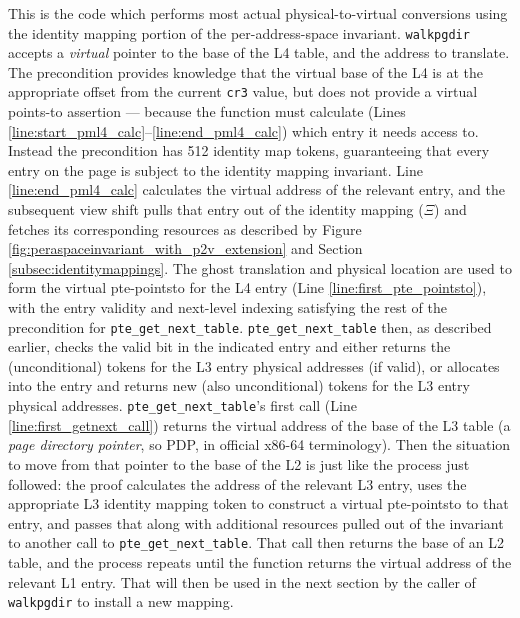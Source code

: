 This is the code which performs most actual physical-to-virtual conversions using the identity mapping portion of the per-address-space invariant.
\lstinline|walkpgdir| accepts a \emph{virtual} pointer to the base of the L4 table, and the address to translate.
The precondition provides knowledge that the virtual base of the L4 is at the appropriate offset from the current \lstinline|cr3| value,
but does not provide a virtual points-to assertion --- because the function must calculate (Lines \ref{line:start_pml4_calc}--\ref{line:end_pml4_calc})
which entry it needs access to.
Instead the precondition has 512 identity map tokens, guaranteeing that every entry on the page is subject to the identity mapping invariant.
Line \ref{line:end_pml4_calc} calculates the virtual address of the relevant entry, and the subsequent view shift
pulls that entry out of the identity mapping ($\Xi$) and fetches its corresponding resources as
described by Figure \ref{fig:peraspaceinvariant_with_p2v_extension} and Section \ref{subsec:identitymappings}.
The ghost translation and physical location are used to form the virtual pte-pointsto for the L4 entry
(Line \ref{line:first_pte_pointsto}), with the entry validity and next-level indexing
satisfying the rest of the precondition for \lstinline|pte_get_next_table|.
\lstinline|pte_get_next_table| then, as described earlier, checks the valid bit in the indicated
entry and either returns the (unconditional) tokens for the L3 entry physical addresses (if valid), or
allocates into the entry and returns new (also unconditional) tokens for the L3 entry physical addresses.
\lstinline|pte_get_next_table|'s first call (Line \ref{line:first_getnext_call}) returns
the virtual address of the base of the L3 table (a \emph{page directory pointer}, so PDP, in official
x86-64 terminology). Then the situation to move from that pointer to the base of the L2
is just like the process just followed: the proof calculates the address of the relevant
L3 entry, uses the appropriate L3 identity mapping token to construct a virtual pte-pointsto to that entry,
and passes that along with additional resources pulled out of the invariant to another call to
\lstinline|pte_get_next_table|. That call then returns the base of an L2 table, and the process
repeats until the function returns the virtual address of the relevant L1 entry.
That will then be used in the next section by the caller of \lstinline|walkpgdir|
to install a new mapping.


